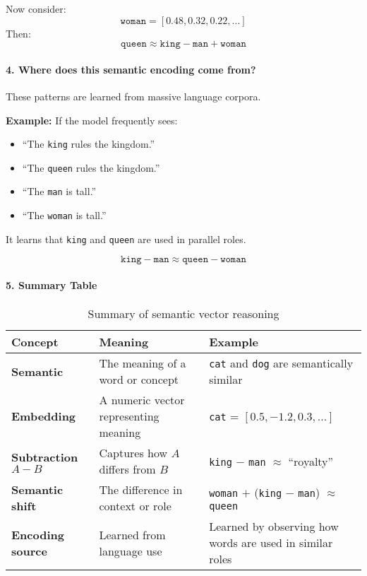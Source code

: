 Now consider:
\[
\texttt{woman} = [0.48, 0.32, 0.22, \dots]
\]
Then:
\[
\texttt{queen} \approx \texttt{king} - \texttt{man} + \texttt{woman}
\]

\paragraph{4. Where does this semantic encoding come from?}
These patterns are learned from massive language corpora.

\textbf{Example:}
If the model frequently sees:
\begin{itemize}
	\item “The \texttt{king} rules the kingdom.”
	\item “The \texttt{queen} rules the kingdom.”
	\item “The \texttt{man} is tall.”
	\item “The \texttt{woman} is tall.”
\end{itemize}
It learns that \texttt{king} and \texttt{queen} are used in parallel roles.

\[
\texttt{king} - \texttt{man} \approx \texttt{queen} - \texttt{woman}
\]

\paragraph{5. Summary Table}

\begin{table}[h!]
	\centering
	\begin{tabular}{|l|l|p{6cm}|}
		\hline
		\textbf{Concept} & \textbf{Meaning} & \textbf{Example} \\\hline
		\textbf{Semantic} & The meaning of a word or concept & \texttt{cat} and \texttt{dog} are semantically similar \\\hline
		\textbf{Embedding} & A numeric vector representing meaning & \texttt{cat} = $[0.5, -1.2, 0.3, \dots]$ \\\hline
		\textbf{Subtraction $A - B$} & Captures how $A$ differs from $B$ & \texttt{king} $-$ \texttt{man} $\approx$ ``royalty'' \\\hline
		\textbf{Semantic shift} & The difference in context or role & \texttt{woman} $+$ (\texttt{king} $-$ \texttt{man}) $\approx$ \texttt{queen} \\\hline
		\textbf{Encoding source} & Learned from language use & Learned by observing how words are used in similar roles \\\hline
	\end{tabular}
	\caption{Summary of semantic vector reasoning}
\end{table}


